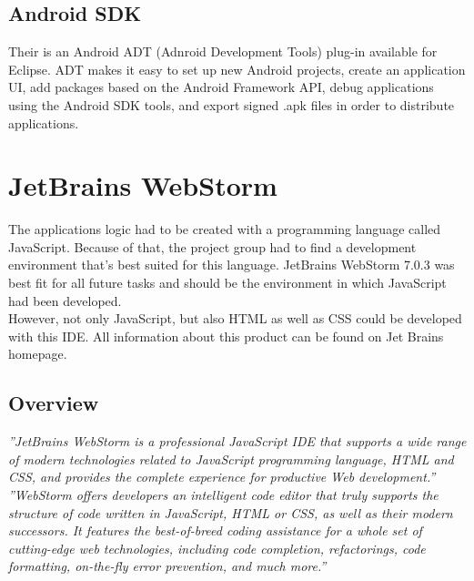 \subsection{Android SDK}
Their is an Android ADT (Adnroid Development Tools) plug-in available for Eclipse. ADT makes it easy to set up new Android projects, create an application UI, add packages based on the Android Framework API, debug applications using the Android SDK tools, and export signed .apk files in order to distribute  applications.














\section{JetBrains WebStorm}
The applications logic had to be created with a programming language called JavaScript. Because of that, the project group had to find a development environment that's best suited for this language. JetBrains WebStorm 7.0.3 was best fit for all future tasks and should be the environment in which JavaScript had been developed. 
\\

However, not only JavaScript, but also HTML as well as CSS could be developed with this IDE. All information about this product can be found on Jet Brains homepage.\cite{webstorm}
\subsection{Overview}
\textit{''JetBrains WebStorm is a professional JavaScript IDE that supports a wide range of modern technologies related to JavaScript programming language, HTML and  CSS, and provides the complete experience for productive Web development.''}\cite{webstorm}
\\

\textit{''WebStorm offers developers an intelligent code editor that truly supports the structure of code written in JavaScript, HTML or CSS, as well as their modern  successors. It features the best-of-breed coding assistance for a whole set of  cutting-edge web technologies, including code completion, refactorings, code formatting, on-the-fly error prevention, and much more.''}\cite{webstorm}
\\

